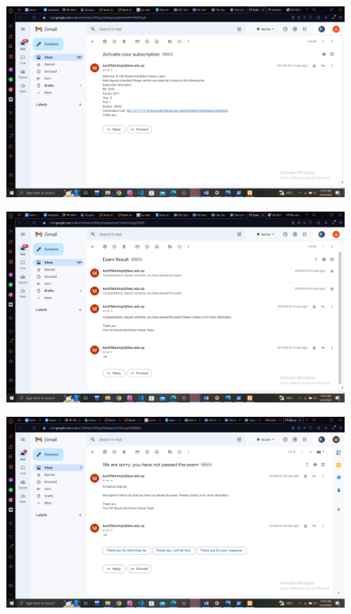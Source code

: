 \begin{figure}[h]
    \centering
    \includegraphics[scale=0.2]{pictures/5.png}
\end{figure}
\newpage
\begin{figure}[h]
    \centering
    \includegraphics[scale=0.2]{pictures/6.png}
\end{figure}

\begin{figure}[h]
    \centering
    \includegraphics[scale=0.2]{pictures/7.png}
\end{figure}


